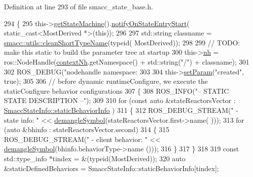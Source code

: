Definition at line 293 of file smacc\+\_\+state\+\_\+base.\+h.


\begin{DoxyCode}
294   \{
295     this->\hyperlink{classsmacc_1_1SmaccState_afc39f8e0ca4001b2159a100da2fccd0e}{getStateMachine}().\hyperlink{classsmacc_1_1ISmaccStateMachine_aeec54e997d715b105ebfeb5caadc4fbf}{notifyOnStateEntryStart}(
      static\_cast<MostDerived *>(\textcolor{keyword}{this}));
296 
297     std::string classname = \hyperlink{namespacesmacc_1_1utils_aacd1975bb7cd9bec4b50e111a2ae7edb}{smacc::utils::cleanShortTypeName}(\textcolor{keyword}{typeid}(
      MostDerived));
298 
299     \textcolor{comment}{// TODO: make this static to build the parameter tree at startup}
300     this->\hyperlink{classsmacc_1_1ISmaccState_a13fe6e6abfdb87996402189d44b78494}{nh} = ros::NodeHandle(\hyperlink{classsmacc_1_1ISmaccState_ae59191a663a08489b7d10036f3b25238}{contextNh}.getNamespace() + std::string(\textcolor{stringliteral}{"/"}) + classname);
301 
302     ROS\_DEBUG(\textcolor{stringliteral}{"nodehandle namespace: %
303 
304     this->\hyperlink{classsmacc_1_1ISmaccState_a0b6c531ca8c446052022308548f55b92}{setParam}(\textcolor{stringliteral}{"created"}, \textcolor{keyword}{true});
305 
306     \textcolor{comment}{// before dynamic runtimeConfigure, we execute the staticConfigure behavior configurations}
307     \{
308       ROS\_INFO(\textcolor{stringliteral}{"-- STATIC STATE DESCRIPTION --"});
309 
310       \textcolor{keywordflow}{for} (\textcolor{keyword}{const} \textcolor{keyword}{auto} &stateReactorsVector : \hyperlink{classsmacc_1_1introspection_1_1SmaccStateInfo_ad3d8b3450060cb0b91f38fb2fe0a7678}{SmaccStateInfo::staticBehaviorInfo}
      )
311       \{
312         ROS\_DEBUG\_STREAM(\textcolor{stringliteral}{" - state info: "} << \hyperlink{namespacesmacc_1_1introspection_a2f495108db3e57604d8d3ff5ef030302}{demangleSymbol}(stateReactorsVector.first->name(
      )));
313         \textcolor{keywordflow}{for} (\textcolor{keyword}{auto} &bhinfo : stateReactorsVector.second)
314         \{
315           ROS\_DEBUG\_STREAM(\textcolor{stringliteral}{" - client behavior: "} << \hyperlink{namespacesmacc_1_1introspection_a2f495108db3e57604d8d3ff5ef030302}{demangleSymbol}(bhinfo.behaviorType->name
      ()));
316         \}
317       \}
318 
319       \textcolor{keyword}{const} std::type\_info *tindex = &(\textcolor{keyword}{typeid}(MostDerived));
320       \textcolor{keyword}{auto} &staticDefinedBehaviors = SmaccStateInfo::staticBehaviorInfo[tindex];
}
\end{DoxyCode}

